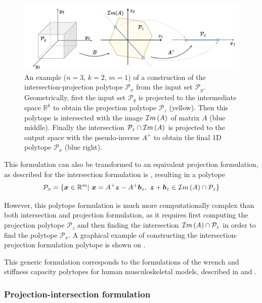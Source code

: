 \begin{figure}[!t]
    \centering
    \includegraphics[width=\linewidth]{Chapters/imgs/spec_int_proj.pdf}
    \caption{An example ($n=3$, $k=2$, $m=1$) of a construction of the intersection-projection polytope $\mathcal{P}_x$ from the input set $\mathcal{P}_y$. Geometrically, first the input set $\mathcal{P}_y$ is projected to the intermediate space $\mathbb{R}^k$ to obtain the projection polytope $\mathcal{P}_z$ (yellow). Then this polytope is intersected with the image $\mathcal{I}m\left(A\right)$ of matrix $A$ (blue middle). Finally the intersection $\mathcal{P}_z\cap\mathcal{I}m\left(A\right)$ is projected to the output space with the pseudo-inverse $A^+$ to obtain the final 1D polytope $\mathcal{P}_x$ (blue right).}
    \label{fig:inter_proj_spec}
\end{figure}
This formulation can also be transformed to an equivalent projection formulation, as described for the intersection formulation is , resulting in a polytope 
\begin{equation}
\mathcal{P}_x=\{\bm{x} \in \mathbb{R}^m |~ \bm{x} = A^+\bm{z} - A^+\bm{b}_z,~ \bm{z}+\bm{b}_z \in \mathcal{I}m\left(A\right)\cap\mathcal{P}_z\} 
\end{equation}

However, this polytope formulation is much more computationally complex than both intersection and projection formulation, as it requires first computing the projection polytope $\mathcal{P}_z$ and then finding the intersection $\mathcal{I}m\left(A\right)\cap\mathcal{P}_z$ in order to find the polytope $\mathcal{P}_x$. A graphical example of constructing the intersection-projection formulation polytope is shown on .


\begin{remark}
    This generic formulation corresponds to the formulations of the wrench and stiffness capacity polytopes for human musculoskeletal models, described in  and .
\end{remark}


\subsubsection{Projection-intersection formulation}
\label{ch:proj_inter_form}

